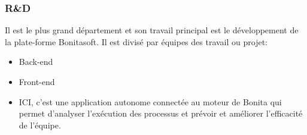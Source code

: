 \subsubsection{R\&D}
Il est le plus grand département et son travail principal est le développement
de la plate-forme Bonitasoft.
Il est divisé par équipes des travail ou projet:
\begin{itemize}
  \item Back-end
  \item Front-end
  \item ICI, c'est une application autonome connectée au moteur de Bonita qui permet d'analyser l'exécution
   des processus et prévoir et améliorer l'efficacité de l'équipe.
\end{itemize}
